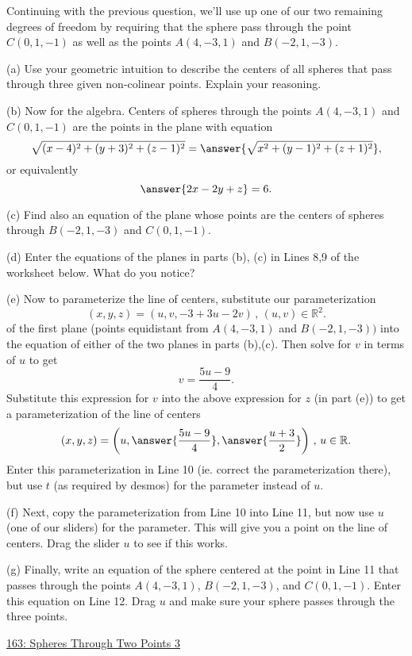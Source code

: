 \documentclass{ximera}
\begin{document}
\begin{question} \label{Q:LKdf44g44tr4}
Continuing with the previous question, we'll use up one of our two remaining degrees of freedom by requiring that the sphere pass through the point $C(0,1,-1)$ as well as the points $A(4,-3,1)$ and $B(-2,1,-3)$.

\begin{freeResponse}
(a) Use your geometric intuition to describe the centers of all spheres that pass through three given non-colinear points. Explain your reasoning.
\end{freeResponse}

(b) Now for the algebra. Centers of spheres through the points $A(4,-3,1)$ and $C(0,1,-1)$ are the points in the plane with equation
\[
     \sqrt{(x-4)^2 + (y+3)^2 + (z-1)^2} = \answer{\sqrt{x^2 + (y-1)^2 + (z+1)^2}} ,
\]
or equivalently
\[
   \answer{2x -2y +z} = 6 .
\]

(c) Find also an equation of the plane whose points are the centers of spheres through $B(-2,1,-3)$ and $C(0,1,-1)$.

(d) Enter the equations of the planes in parts (b), (c) in Lines 8,9 of the worksheet below. What do you notice?

(e) Now to parameterize the line of centers, substitute our parameterization 
\[
      (x,y,z) = (u,v,-3+3u-2v) \, , \, (u,v)\in \mathbb{R}^2 .
\]
of the first plane (points equidistant from $A(4,-3,1)$ and $B(-2,1,-3))$ into the equation of either of the two planes in parts (b),(c). Then solve for $v$ in terms of $u$ to get
\[
   v = \frac{5u-9}{4} .
\]
Substitute this expression for $v$ into the above expression for $z$ (in part (e)) to get a parameterization of the line of centers
\[
   (x,y,z) = \left( u, \answer{\frac{5u-9}{4}} , \answer{\frac{u+3}{2} }    \right) \, , \, u\in \mathbb{R} .
\]
Enter this parameterization in Line 10 (ie. correct the parameterization there), but use $t$ (as required by desmos) for the  parameter instead of $u$.

(f) Next, copy the parameterization from Line 10 into Line 11, but now use $u$ (one of our sliders) for the parameter. This will give you a point on the line of centers. Drag the slider $u$ to see if this works.

(g) Finally, write an equation of the sphere centered at the point in Line 11 that passes through the points $A(4,-3,1)$, $B(-2,1,-3)$, and $C(0,1,-1)$. Enter this equation on Line 12. Drag $u$ and make sure your sphere passes through the three points.


\begin{onlineOnly}
    \begin{center}
\end{center}
\end{onlineOnly}

\href{https://www.desmos.com/3d/odg1a38tg0}{163: Spheres Through Two Points 3}


\end{question}
\end{document}

